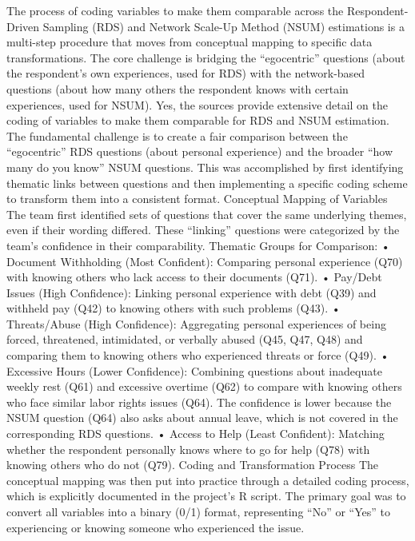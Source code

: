 \documentclass[
  12pt,
  letterpaper,
  DIV=11,
  numbers=noendperiod]{scrartcl}
\theoremstyle{plain}
\theoremstyle{definition}
\begin{document}
The process of coding variables to make them comparable across the
Respondent-Driven Sampling (RDS) and Network Scale-Up Method (NSUM)
estimations is a multi-step procedure that moves from conceptual mapping
to specific data transformations. The core challenge is bridging the
``egocentric'' questions (about the respondent's own experiences, used
for RDS) with the network-based questions (about how many others the
respondent knows with certain experiences, used for NSUM). Yes, the
sources provide extensive detail on the coding of variables to make them
comparable for RDS and NSUM estimation. The fundamental challenge is to
create a fair comparison between the ``egocentric'' RDS questions (about
personal experience) and the broader ``how many do you know'' NSUM
questions. This was accomplished by first identifying thematic links
between questions and then implementing a specific coding scheme to
transform them into a consistent format. Conceptual Mapping of Variables
The team first identified sets of questions that cover the same
underlying themes, even if their wording differed. These ``linking''
questions were categorized by the team's confidence in their
comparability. Thematic Groups for Comparison: • Document Withholding
(Most Confident): Comparing personal experience (Q70) with knowing
others who lack access to their documents (Q71). • Pay/Debt Issues (High
Confidence): Linking personal experience with debt (Q39) and withheld
pay (Q42) to knowing others with such problems (Q43). • Threats/Abuse
(High Confidence): Aggregating personal experiences of being forced,
threatened, intimidated, or verbally abused (Q45, Q47, Q48) and
comparing them to knowing others who experienced threats or force (Q49).
• Excessive Hours (Lower Confidence): Combining questions about
inadequate weekly rest (Q61) and excessive overtime (Q62) to compare
with knowing others who face similar labor rights issues (Q64). The
confidence is lower because the NSUM question (Q64) also asks about
annual leave, which is not covered in the corresponding RDS questions. •
Access to Help (Least Confident): Matching whether the respondent
personally knows where to go for help (Q78) with knowing others who do
not (Q79). Coding and Transformation Process The conceptual mapping was
then put into practice through a detailed coding process, which is
explicitly documented in the project's R script. The primary goal was to
convert all variables into a binary (0/1) format, representing ``No'' or
``Yes'' to experiencing or knowing someone who experienced the issue.
\end{document}
